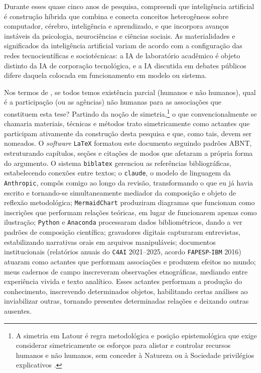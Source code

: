 Durante esses quase cinco anos de pesquisa, compreendi que inteligência artificial é construção híbrida que combina e conecta conceitos heterogêneos sobre computador, cérebro, inteligência e aprendizado, e que incorpora avanços instáveis da psicologia, neurociências e ciências sociais. As materialidades e significados da inteligência artificial variam de acordo com a configuração das redes tecnocientíficas e sociotécnicas: a IA de laboratório acadêmico é objeto distinto da IA de corporação tecnológica, e a IA discutida em debates públicos difere daquela colocada em funcionamento em modelo ou sistema.

Nos termos de \textcite{Latour2008Powers}, se todos temos existência parcial (humanos e não humanos), qual é a participação (ou as agências) não humanas para as associações que constituem esta tese? Partindo da noção de simetria,\footnote{A simetria em Latour é regra metodológica e posição epistemológica que exige considerar simetricamente os esforços para alistar e controlar recursos humanos e não humanos, sem conceder à Natureza ou à Sociedade privilégios explicativos \parencite{Latour2011CienciaEmAcao}.} o que convencionalmente se chamaria materiais, técnicas e métodos trato simetricamente como actantes que participam ativamente da construção desta pesquisa e que, como tais, devem ser nomeados. O \textit{software} \texttt{LaTeX}{} formatou este documento seguindo padrões ABNT, estruturando capítulos, seções e citações de modos que afetaram a própria forma do argumento. O sistema \texttt{biblatex} gerenciou as referências bibliográficas, estabelecendo conexões entre textos; o \texttt{claude}, o modelo de linguagem da \texttt{Anthropic}, compôs comigo ao longo da revisão, transformando o que eu já havia escrito e tornando-se simultaneamente mediador da composição e objeto de reflexão metodológica; \texttt{MermaidChart} produziram diagramas que funcionam como inscrições que performam relações teóricas, em lugar de funcionarem apenas como ilustração; \texttt{Python} e \texttt{Anaconda} processaram dados bibliométricos, dando a ver padrões de composição científica; gravadores digitais capturaram entrevistas, estabilizando narrativas orais em arquivos manipuláveis; documentos institucionais (relatórios anuais do \texttt{C4AI} 2021--2025, acordo \texttt{FAPESP}-\texttt{IBM} 2016) atuaram como actantes que performam associações e produzem efeitos no mundo; meus cadernos de campo inscreveram observações etnográficas, mediando entre experiência vivida e texto analítico. Esses actantes performam a produção do conhecimento, inscrevendo determinados objetos, habilitando certas análises ao inviabilizar outras, tornando presentes determinadas relações e deixando outras ausentes.

